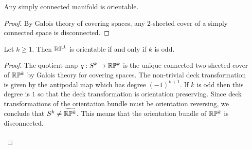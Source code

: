 \documentclass[a4paper]{article}
\begin{document}
\begin{crl}{}{} Any simply connected manifold is orientable. \tcbline
\begin{proof}
By Galois theory of covering spaces, any $2$-sheeted cover of a simply connected space is disconnected. 
\end{proof}
\end{crl}

\begin{prp}{}{} Let $k\geq 1$. Then $\mathbb{R}\mathbb{P}^k$ is orientable if and only if $k$ is odd. \tcbline
\begin{proof}
The quotient map $q:S^k\to\mathbb{R}\mathbb{P}^k$ is the unique connected two-sheeted cover of $\mathbb{R}\mathbb{P}^k$ by Galois theory for covering spaces. The non-trivial deck transformation is given by the antipodal map which has degree $(-1)^{k+1}$. If $k$ is odd then this degree is $1$ so that the deck transformation is orientation preserving. Since deck transformations of the orientation bundle must be orientation reversing, we conclude that $S^k\neq\widetilde{\mathbb{R}\mathbb{P}^k}$. This means that the orientation bundle of $\mathbb{R}\mathbb{P}^k$ is disconnected. \\~\\


\end{proof}
\end{prp}
\end{document}
